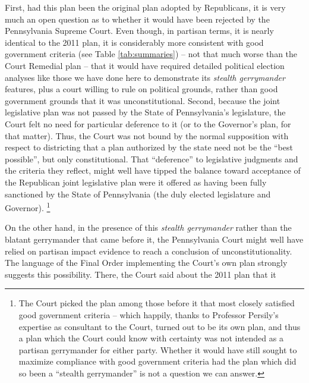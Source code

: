     First, had this plan been the original plan adopted by Republicans, it is very much an open question as to whether it would have been rejected by the Pennsylvania Supreme Court. Even though, in partisan terms, it is nearly identical to the 2011 plan, it is considerably more consistent with good government criteria (see Table \ref{tab:summaries}) -- not that much worse than the Court Remedial plan -- that it would have required detailed political election analyses like those we have done here to demonstrate its \textit{stealth gerrymander} features, plus a court willing to rule on political grounds, rather than good government grounds that it was unconstitutional. Second, because the joint legislative plan was not passed by the State of Pennsylvania's legislature, the Court felt no need for particular deference to it (or to the Governor's plan, for that matter). Thus, the Court was not bound by the normal supposition with respect to districting that a plan authorized by the state need not be the ``best possible'', but only constitutional. That ``deference'' to legislative judgments and the criteria they reflect, might well have tipped the balance toward acceptance of the Republican joint legislative plan were it offered as having been fully sanctioned by the State of Pennsylvania (the duly elected legislature and Governor). 
        \footnote{The Court picked the plan among those before it that most closely satisfied good government criteria -- which happily, thanks to Professor Persily's expertise as consultant to the Court, turned out to be its own plan, and thus a plan which the Court could know with certainty was not intended as a partisan gerrymander for either party. Whether it would have still sought to maximize compliance with good government criteria had the plan which did so been a ``stealth gerrymander'' is not a question we can answer.}       
\par    
    On the other hand, in the presence of this \textit{stealth gerrymander} rather than the blatant gerrymander that came before it, the Pennsylvania Court might well have relied on partisan impact evidence to reach a conclusion of unconstitutionality. The language of the Final Order implementing the Court's own plan strongly suggests this possibility. There, the Court said about the 2011 plan that it 
